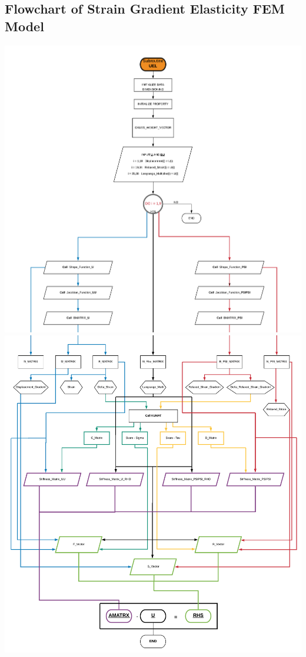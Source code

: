 \documentclass[12pt]{article}
\begin{document}
\begin{appendices}
\section{Flowchart of Strain Gradient Elasticity FEM Model}
\vspace{5cm}
\includegraphics[scale=0.60,page=1]{flow_chart_1.pdf}
\newpage
\includegraphics[scale=0.60,page=1]{flow_chart_2.pdf}
\newpage

\end{appendices}
\end{document}
